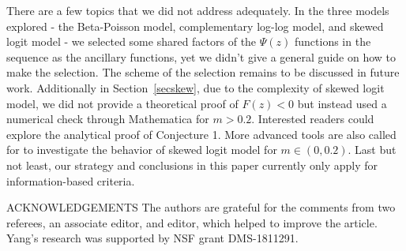 \documentclass[12pt]{TD-CJS}
\begin{document}
There are a few topics that we did not address adequately. In the three models explored - the Beta-Poisson model, complementary log-log model, and skewed logit model - we selected some shared factors of the $\Psi(z)$ functions in the sequence as the ancillary functions, yet we didn't give a general guide on how to make the selection. The scheme of the selection remains to be discussed in future work. Additionally in Section~\ref{secskew}, due to the complexity of skewed logit model, we did not provide a theoretical proof of $F(z)<0$ but instead used a numerical check through Mathematica for $m>0.2$. Interested readers could explore the analytical proof of Conjecture 1. More advanced tools are also called for to investigate the behavior of skewed logit model for $m\in (0,0.2)$. Last but not least, our strategy and conclusions in this paper currently only apply for information-based criteria. 





\begin{ack}{ACKNOWLEDGEMENTS}
The authors are grateful for the comments from two referees, an associate editor, and editor, which helped to improve the article. Yang’s research was supported by NSF grant DMS-1811291.
\end{ack}
% 
%  
\end{document}
